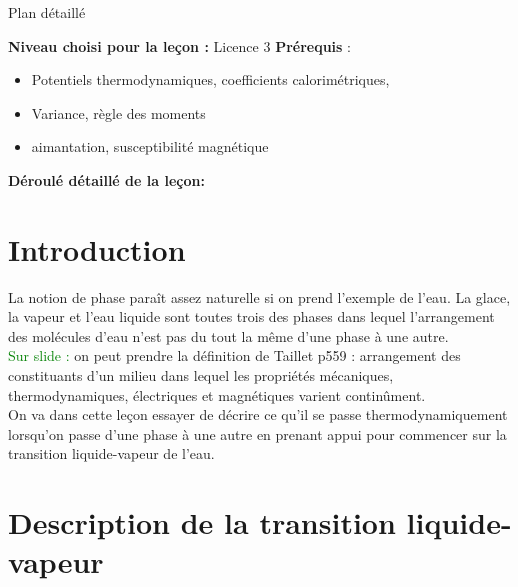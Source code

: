 
\begin{reportBlock}{Plan détaillé}

  \textbf{Niveau choisi pour la leçon :} Licence 3
  \newline
  \textbf{Prérequis} : \begin{itemize}
      \item Potentiels thermodynamiques, coefficients calorimétriques,
      \item Variance, règle des moments
      \item aimantation, susceptibilité magnétique
  \end{itemize}

  \textbf{Déroulé détaillé de la leçon: }  
  
  \section*{Introduction}
La notion de phase paraît assez naturelle si on prend l'exemple de l'eau. La glace, la vapeur et l'eau liquide sont toutes trois des phases dans lequel l'arrangement des molécules d'eau n'est pas du tout la même d'une phase à une autre.\\
\textcolor{green}{Sur slide : } on peut prendre la définition de Taillet p559 : arrangement des constituants d'un milieu dans lequel les propriétés mécaniques, thermodynamiques, électriques et magnétiques varient continûment. \\
On va dans cette leçon essayer de décrire ce qu'il se passe thermodynamiquement lorsqu'on passe d'une phase à une autre en prenant appui pour commencer sur la transition liquide-vapeur de l'eau.
  
  
  \section{Description de la transition liquide-vapeur}

\end{reportBlock}
